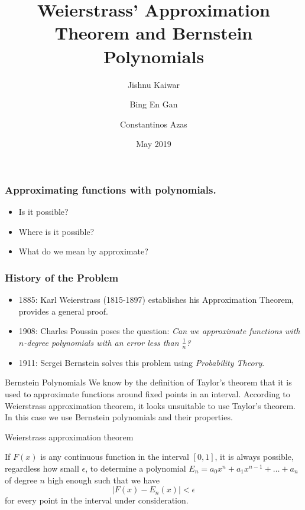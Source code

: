 \documentclass[mathserif,serif]{beamer}
\title{Weierstrass' Approximation Theorem and Bernstein Polynomials}
\author{Jishnu Kaiwar
  \and
  Bing En Gan
  \and
  Constantinos Azas}
\date{May 2019}
\begin{document}
\frame{\titlepage}

\begin{frame}
  \frametitle{Approximating functions with polynomials.}
  \begin{itemize}
  \item<+-> Is it possible?
  \item<+-> Where is it possible?
  \item<+-> What do we mean by approximate?

  \end{itemize}
\end{frame}

\begin{frame}
  \frametitle{History of the Problem}
  \begin{itemize}
  \item 1885: Karl Weierstrass (1815-1897) establishes his Approximation Theorem, provides a general proof.
  \item 1908: Charles Poussin poses the question: \emph{Can we approximate functions with $n$-degree polynomials with an error less than $\frac{1}{n}$?}
  \item 1911: Sergei Bernstein solves this problem using \emph{Probability Theory}.
  \end{itemize}
\end{frame}

\begin{frame}{Bernstein Polynomials}
We know by the definition of Taylor's theorem that it is used to approximate functions around fixed points in an interval. According to Weierstrass approximation theorem, it looks unsuitable to use Taylor's theorem. In this case we use Bernstein polynomials and their properties.    
\end{frame}

\begin{frame}{Weierstrass approximation theorem}
\begin{theorem}
If $F(x)$ is any continuous function in the interval $[0,1]$, it is always possible, regardless how small $\epsilon$, to determine a polynomial $E_n=a_0x^n+a_1x^{n-1}+\dots+a_n$ of degree $n$ high enough such that we have
\begin{equation*}
    |F(x)-E_n(x)|<\epsilon
\end{equation*}
for every point in the interval under consideration.
\end{theorem}
\end{frame}
\end{document}
